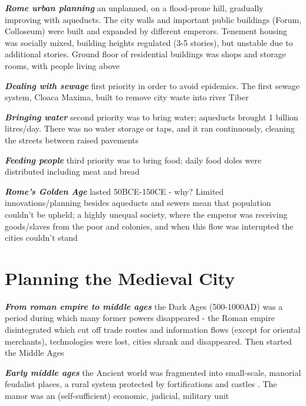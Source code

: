 \documentclass{article}
\newcommand{\bisection}[1]{\textbf{\textit{#1}}}
\newcommand{\alignedmarginpar}[1]{%
        \marginpar{\raggedright\small #1}
    }
\begin{document}
\bisection{Rome urban planning} an unplanned, on a flood-prone hill, gradually improving with aqueducts. The city walls and important public buildings (Forum, Colloseum) were built and expanded by different emperors. Tenement housing was socially mixed, building heights regulated (3-5 stories), but unstable due to additional stories. Ground floor of residential buildings was shops and storage rooms, with people living above

\bisection{Dealing with sewage} first priority in order to avoid epidemics. The first sewage system, Cloaca Maxima, built to remove city waste into river Tiber

\bisection{Bringing water} second priority was to bring water; aqueducts brought 1 billion litres/day. There was no water storage or taps, and it ran continuously, cleaning the streets between raised pavements

\bisection{Feeding people} third priority was to bring food; daily food doles were distributed including meat and bread

\bisection{Rome's Golden Age} lasted 50BCE-150CE - why? Limited innovations/planning besides aqueducts and sewers mean that population couldn't be upheld; a highly unequal society, where the emperor was receiving goods/slaves from the poor and colonies, and when this flow was interupted the cities couldn't stand


\pagebreak
\section{Planning the Medieval City}

\bisection{From roman empire to middle ages} the Dark Ages (500-1000AD) was a period during which many former powers disappeared - the Roman empire disintegrated which cut off trade routes and information flows (except for oriental merchants), technologies were lost, cities shrank and disappeared. Then started the Middle Ages

\bisection{Early middle ages} the Ancient world was fragmented into small-scale, manorial feudalist places, a rural system protected by fortifications and castles\alignedmarginpar{Tower of London, Ljubljana castle}. The manor was an (self-sufficient) economic, judicial, military unit
\end{document}
